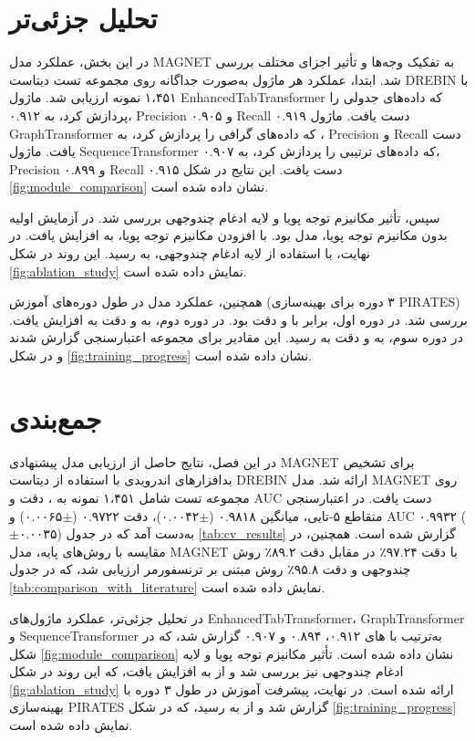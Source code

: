 \section{تحلیل جزئی‌تر}
در این بخش، عملکرد مدل MAGNET به تفکیک وجه‌ها و تأثیر اجزای مختلف بررسی شد. ابتدا، عملکرد هر ماژول به‌صورت جداگانه روی مجموعه تست دیتاست DREBIN \cite{Drebin} با ۱،۴۵۱ نمونه ارزیابی شد. ماژول EnhancedTabTransformer که داده‌های جدولی را پردازش کرد، به  ۰.۹۱۲، Precision ۰.۹۰۵ و Recall ۰.۹۱۹ دست یافت. ماژول GraphTransformer که داده‌های گرافی را پردازش کرد، به  ، Precision  و Recall  دست یافت. ماژول SequenceTransformer که داده‌های ترتیبی را پردازش کرد، به  ۰.۹۰۷، Precision ۰.۸۹۹ و Recall ۰.۹۱۵ دست یافت. این نتایج در شکل \ref{fig:module_comparison} نشان داده شده است.

سپس، تأثیر مکانیزم توجه پویا و لایه ادغام چندوجهی بررسی شد. در آزمایش اولیه بدون مکانیزم توجه پویا،  مدل  بود. با افزودن مکانیزم توجه پویا،  به  افزایش یافت. در نهایت، با استفاده از لایه ادغام چندوجهی،  به  رسید. این روند در شکل \ref{fig:ablation_study} نمایش داده شده است.

همچنین، عملکرد مدل در طول دوره‌های آموزش (۳ دوره برای بهینه‌سازی PIRATES) بررسی شد. در دوره اول،  برابر با  و دقت  بود. در دوره دوم،  به  و دقت به  افزایش یافت. در دوره سوم،  به  و دقت به  رسید. این مقادیر برای مجموعه اعتبارسنجی گزارش شدند و در شکل \ref{fig:training_progress} نشان داده شده است.

\section{جمع‌بندی}
در این فصل، نتایج حاصل از ارزیابی مدل پیشنهادی MAGNET برای تشخیص بدافزارهای اندرویدی با استفاده از دیتاست DREBIN \cite{Drebin} ارائه شد. مدل MAGNET روی مجموعه تست شامل ۱،۴۵۱ نمونه به  ، دقت  و AUC  دست یافت. در اعتبارسنجی متقاطع ۵-تایی، میانگین  ۰.۹۸۱۸ ($\pm$۰.۰۰۴۲)، دقت ۰.۹۷۲۲ ($\pm$۰.۰۰۶۵) و AUC ۰.۹۹۳۲ ($\pm$۰.۰۰۳۵) به‌دست آمد که در جدول \ref{tab:cv_results} گزارش شده است. همچنین، در مقایسه با روش‌های پایه، مدل MAGNET با دقت ۹۷.۲۴٪ در مقابل دقت ۸۹.۲٪ روش چندوجهی \cite{Alsaleh2023} و دقت ۹۵.۸٪ روش مبتنی بر ترنسفورمر \cite{TransformerMalware} ارزیابی شد، که در جدول \ref{tab:comparison_with_literature} نمایش داده شده است.

در تحلیل جزئی‌تر، عملکرد ماژول‌های EnhancedTabTransformer، GraphTransformer و SequenceTransformer به‌ترتیب با های ۰.۹۱۲، ۰.۸۹۴ و ۰.۹۰۷ گزارش شد، که در شکل \ref{fig:module_comparison} نشان داده شده است. تأثیر مکانیزم توجه پویا و لایه ادغام چندوجهی نیز بررسی شد و  از  به  افزایش یافت، که این روند در شکل \ref{fig:ablation_study} ارائه شده است. در نهایت، پیشرفت آموزش در طول ۳ دوره با بهینه‌سازی PIRATES گزارش شد و  از  به  رسید، که در شکل \ref{fig:training_progress} نمایش داده شده است.

